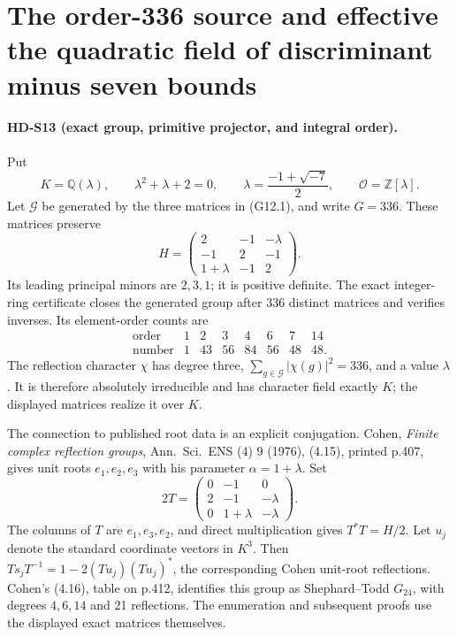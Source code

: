 \section{The order-336 source and effective the quadratic field of discriminant minus seven bounds}
\label{sec:g24-effective}

\paragraph{HD-S13 (exact group, primitive projector, and integral order).}
Put
\[
 K=\mathbb Q(\lambda),\qquad \lambda^2+\lambda+2=0,\qquad
 \lambda=\frac{-1+\sqrt{-7}}2,\qquad\mathcal O=\mathbb Z[\lambda].
\]
Let \(\mathcal G\) be generated by the three matrices in (G12.1), and
write \(G=336\). These matrices preserve
\[
 H=\begin{pmatrix}2&-1&-\lambda\\-1&2&-1\\1+\lambda&-1&2\end{pmatrix}.
\]
Its leading principal minors are \(2,3,1\); it is positive definite.
The exact integer-ring certificate closes the generated group after
336 distinct matrices and verifies inverses. Its element-order counts
are
\[
\begin{array}{c|rrrrrrr}
\text{order}&1&2&3&4&6&7&14\\ \hline
\text{number}&1&43&56&84&56&48&48.
\end{array}
\]
The reflection character \(\chi\) has degree three,
\(\sum_{g\in\mathcal G}|\chi(g)|^2=336\), and a value \(\lambda\).
It is therefore absolutely irreducible and has character field
exactly \(K\); the displayed matrices realize it over \(K\).

The connection to published root data is an explicit conjugation.
Cohen, \emph{Finite complex reflection groups},
Ann.\ Sci.\ ENS (4) 9 (1976), (4.15), printed p.407, gives unit
roots \(e_1,e_2,e_3\) with his parameter
\(\alpha=1+\lambda\). Set
\[
 2T=\begin{pmatrix}0&-1&0\\2&-1&-\lambda\\
                   0&1+\lambda&-\lambda\end{pmatrix}.
\]
The columns of \(T\) are \(e_1,e_3,e_2\), and direct multiplication
gives \(T^*T=H/2\). Let \(u_j\) denote the standard coordinate
vectors in \(K^3\). Then
\(Ts_jT^{-1}=1-2(Tu_j)(Tu_j)^*\), the corresponding Cohen
unit-root reflections. Cohen's (4.16), table on p.412, identifies
this group as Shephard--Todd \(G_{24}\), with degrees \(4,6,14\)
and 21 reflections. The enumeration and subsequent proofs use
the displayed exact matrices themselves.

